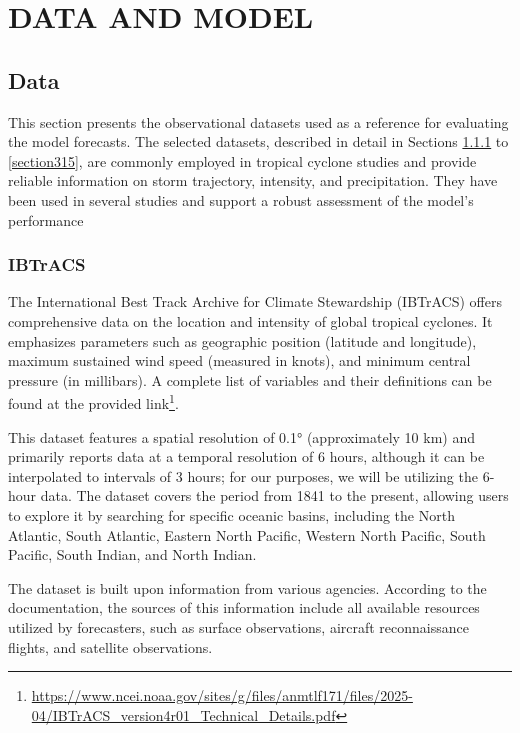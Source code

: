 \chapter{DATA AND MODEL}
\label{ch:data}

\section{Data}

This section presents the observational datasets used as a reference for evaluating the model forecasts. The selected datasets, described in detail in Sections \ref{section311} to \ref{section315}, are commonly employed in tropical cyclone studies and provide reliable information on storm trajectory, intensity, and precipitation. They have been used in several studies \cite{zhou2021regionalization, bopape2021sensitivity, dulac2024assessing, yang2024evaluation, may2024cnn} and support a robust assessment of the model's performance

\subsection{IBTrACS}
\label{section311}

The International Best Track Archive for Climate Stewardship (IBTrACS) \cite{knapp2010international} offers comprehensive data on the location and intensity of global tropical cyclones. It emphasizes parameters such as geographic position (latitude and longitude), maximum sustained wind speed (measured in knots), and minimum central pressure (in millibars). A complete list of variables and their definitions can be found at the provided link\footnote{\url{https://www.ncei.noaa.gov/sites/g/files/anmtlf171/files/2025-04/IBTrACS_version4r01_Technical_Details.pdf}}.

This dataset features a spatial resolution of 0.1° (approximately 10 km) and primarily reports data at a temporal resolution of 6 hours, although it can be interpolated to intervals of 3 hours; for our purposes, we will be utilizing the 6-hour data. The dataset covers the period from 1841 to the present, allowing users to explore it by searching for specific oceanic basins, including the North Atlantic, South Atlantic, Eastern North Pacific, Western North Pacific, South Pacific, South Indian, and North Indian.

The dataset is built upon information from various agencies. According to the documentation, the sources of this information include all available resources utilized by forecasters, such as surface observations, aircraft reconnaissance flights, and satellite observations.

